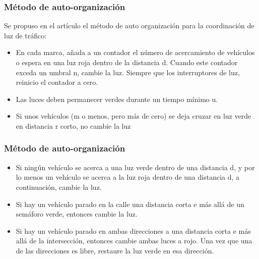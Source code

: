 \documentclass{beamer}
\begin{document}
\begin{frame}
\frametitle{Método de auto-organización}

Se propuso en el artículo el método de auto organización para la coordinación de luz de tráfico:\\
\begin{itemize}
	\justifying 
	\item En cada marca, añada a un contador el número de acercamiento de vehículos o espera en una luz roja dentro de la distancia d. Cuando este contador exceda un umbral n, cambie la luz. Siempre que los interruptores de luz, reinicio el contador a cero.
	\item Las luces deben permanecer verdes durante un tiempo mínimo u.
	\item Si unos vehículos (m o menos, pero más de cero) se deja cruzar en luz verde en distancia r corto, no cambie la luz
\end{itemize}


%

%
%
%
\end{frame}
\begin{frame}
	\frametitle{Método de auto-organización}
	
	
	\begin{itemize}
		\justifying 
		\item Si ningún vehículo se acerca a una luz verde dentro de una distancia d, y por lo menos un vehículo se acerca a la luz roja dentro de una distancia d, a continuación, cambie la luz.
		\item Si hay un vehículo parado en la calle una distancia corta e más allá de un semáforo verde, entonces cambie la luz. 
		\item Si hay un vehículo parado en ambas direcciones a una distancia corta e más allá de la intersección, entonces cambie ambas luces a rojo. Una vez que una de las direcciones es libre, restaure la luz verde en esa dirección. 
	\end{itemize}
\end{frame}
\end{document}
